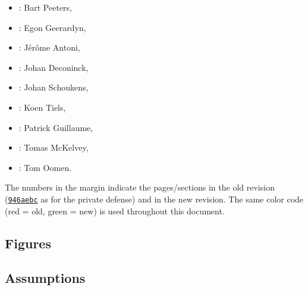 \documentclass{responseletter}
\begin{document}
\begin{minipage}{0.33\columnwidth}
\begin{itemize}
  \item {}: Bart Peeters,
  \item {}: Egon Geerardyn,
  \item {}: Jérôme Antoni,
\end{itemize}
\end{minipage}
\begin{minipage}{0.33\columnwidth}
\begin{itemize}
  \item {}: Johan Deconinck,
  \item {}: Johan Schoukens,
  \item {}: Koen Tiels,
\end{itemize}
\end{minipage}
\begin{minipage}{0.33\columnwidth}
\begin{itemize}
  \item {}: Patrick Guillaume,
  \item {}: Tomas McKelvey,
  \item {}: Tom Oomen.
\end{itemize}
\end{minipage}

The numbers in the margin indicate the pages/sections in the old revision (\href{https://github.com/egeerardyn/phdthesis/releases/tag/private-submit}{\texttt{946aebc}} as for the private defense) and in the new revision.
The same color code (red = old, green = new) is used throughout this document.

\subsection{Figures}

\subsection{Assumptions}
\end{document}
